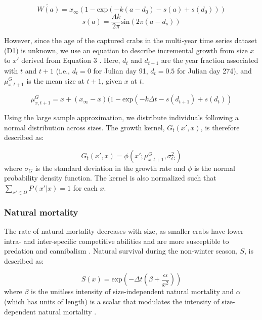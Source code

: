 \documentclass{article}
\begin{document}
\begin{equation}
\widetilde{W(a)} = x_{\infty}(1-\text{exp}(-k(a-d_0) - s(a) + s(d_0)))
\end{equation}
\begin{equation}
s(a) = \frac{Ak}{2\pi} \text{sin}(2\pi(a-d_s)) 
\end{equation}

However, since the age of the captured crabs in the multi-year time series dataset (D1) is unknown, we use an equation to describe incremental growth from size $x$ to $x'$ derived from Equation 3 \parencite{white2016fitting}. Here, $d_t$ and $d_{t+1}$ are the year fraction associated with $t$ and $t+1$ (i.e., $d_t = 0$ for Julian day 91, $d_t = 0.5$ for Julian day 274), and $\mu^G_{x,t+1}$ is the mean size at $t+1$, given $x$ at $t$.

\begin{equation}
\mu^G_{x,t+1} = x + (x_{\infty}-x)(1-\text{exp}(-k\Delta t-s(d_{t+1})+s(d_t))
\end{equation}

Using the large sample approximation, we distribute individuals following a normal distribution across sizes. The growth kernel, $G_t(x',x)$, is therefore described as:

\begin{equation}
G_t(x',x) = \phi(x'; \mu^G_{x, t+1}, \sigma_G^2)
\end{equation}
where $\sigma_G$ is the standard deviation in the growth rate and $\phi$ is the normal probability density function. The kernel is also normalized such that $\sum_{x' \in \Omega}P(x'|x) = 1$ for each $x$.

\subsubsection*{Natural mortality}

The rate of natural mortality decreases with size, as smaller crabs have lower intra- and inter-specific competitive abilities and are more susceptible to predation and cannibalism \parencite{maszczyk2018body, grosholz2021stage}. Natural survival during the non-winter season, $S$, is described as: 

\begin{equation}
S(x) = \text{exp}\left(-\Delta t(\beta+\frac{\alpha}{x^2})\right)
\end{equation}
where $\beta$ is the unitless intensity of size-independent natural mortality and $\alpha$ (which has units of length) is a scalar that modulates the intensity of size-dependent natural mortality \parencite{carlson2010bayesian}. 
\end{document}
